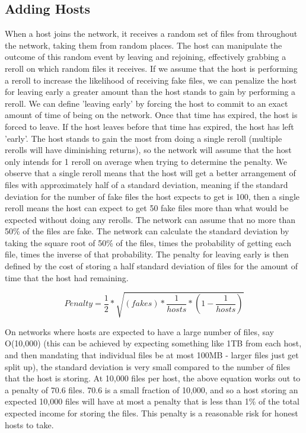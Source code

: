 \documentclass[twocolumn]{article}
\begin{document}
\subsection{Adding Hosts}
When a host joins the network, it receives a random set of files from throughout the network, taking them from random places.
The host can manipulate the outcome of this random event by leaving and rejoining, effectively grabbing a reroll on which random files it receives.
If we assume that the host is performing a reroll to increase the likelihood of receiving fake files, we can penalize the host for leaving early a greater amount than the host stands to gain by performing a reroll.
We can define 'leaving early' by forcing the host to commit to an exact amount of time of being on the network.
Once that time has expired, the host is forced to leave.
If the host leaves before that time has expired, the host has left 'early'.
The host stands to gain the most from doing a single reroll (multiple rerolls will have diminishing returns), so the network will assume that the host only intends for 1 reroll on average when trying to determine the penalty.
We observe that a single reroll means that the host will get a better arrangement of files with approximately half of a standard deviation, meaning if the standard deviation for the number of fake files the host expects to get is 100, then a single reroll means the host can expect to get 50 fake files more than what would be expected without doing any rerolls.
The network can assume that no more than 50\% of the files are fake.
The network can calculate the standard deviation by taking the square root of 50\% of the files, times the probability of getting each file, times the inverse of that probability.
The penalty for leaving early is then defined by the cost of storing a half standard deviation of files for the amount of time that the host had remaining.

\begin{equation}
Penalty = \frac{1}{2} * \sqrt{(fakes) * \frac{1}{hosts} * (1 - \frac{1}{hosts})}
\end{equation}

On networks where hosts are expected to have a large number of files, say O(10,000) (this can be achieved by expecting something like 1TB from each host, and then mandating that individual files be at most 100MB - larger files just get split up), the standard deviation is very small compared to the number of files that the host is storing. At 10,000 files per host, the above equation works out to a penalty of 70.6 files.
70.6 is a small fraction of 10,000, and so a host storing an expected 10,000 files will have at most a penalty that is less than 1\% of the total expected income for storing the files.
This penalty is a reasonable risk for honest hosts to take.
\end{document}
